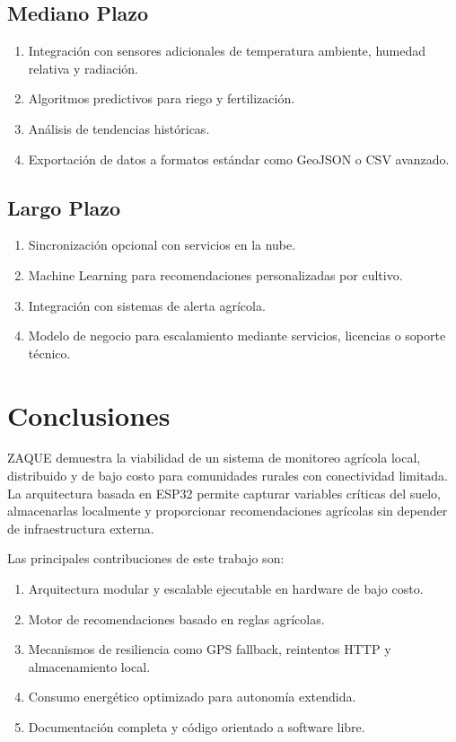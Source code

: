 \documentclass[journal]{IEEEtran}
\begin{document}
\subsection{Mediano Plazo}

\begin{enumerate}
\item Integración con sensores adicionales de temperatura ambiente, humedad relativa y radiación.
\item Algoritmos predictivos para riego y fertilización.
\item Análisis de tendencias históricas.
\item Exportación de datos a formatos estándar como GeoJSON o CSV avanzado.
\end{enumerate}

\subsection{Largo Plazo}

\begin{enumerate}
\item Sincronización opcional con servicios en la nube.
\item Machine Learning para recomendaciones personalizadas por cultivo.
\item Integración con sistemas de alerta agrícola.
\item Modelo de negocio para escalamiento mediante servicios, licencias o soporte técnico.
\end{enumerate}

\section{Conclusiones}

ZAQUE demuestra la viabilidad de un sistema de monitoreo agrícola local, distribuido y de bajo costo para comunidades rurales con conectividad limitada. La arquitectura basada en ESP32 permite capturar variables críticas del suelo, almacenarlas localmente y proporcionar recomendaciones agrícolas sin depender de infraestructura externa.

Las principales contribuciones de este trabajo son:

\begin{enumerate}
\item Arquitectura modular y escalable ejecutable en hardware de bajo costo.
\item Motor de recomendaciones basado en reglas agrícolas.
\item Mecanismos de resiliencia como GPS fallback, reintentos HTTP y almacenamiento local.
\item Consumo energético optimizado para autonomía extendida.
\item Documentación completa y código orientado a software libre.
\end{enumerate}
\end{document}
